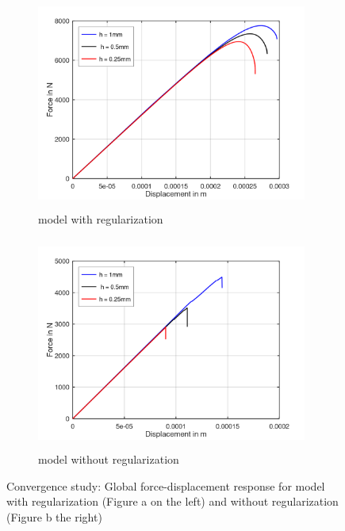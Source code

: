\documentclass[12pt,openright,twoside]{report}
\begin{document}
\begin{figure}[htbp!]
     \captionsetup[subfigure]{justification=centering}
     \begin{subfigure}{0.45\textwidth}
         \includegraphics[width=8.9cm,height=7cm]{25.FvsD.png}
         \caption{model with regularization}
         \label{fig:with regularization}
     \end{subfigure}
     \hspace{1.5cm}
     \begin{subfigure}{0.45\textwidth}
         \includegraphics[width=8.9cm,height=7cm]{25.FvsD2.png}
         \caption{model without regularization}
         \label{fig:without regularization}
     \end{subfigure}
    \caption{Convergence study: Global force-displacement response for model with regularization (Figure a on the left) and without regularization (Figure b the right) }
    \label{fig:Convergence study}
\end{figure}
\FloatBarrier
 
\end{document}
